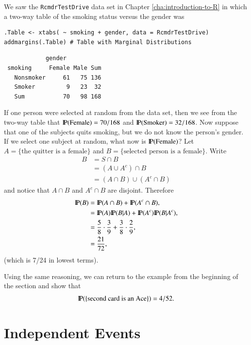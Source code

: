 \documentclass[captions=tableheading]{scrbook}
\begin{document}
\begin{example}
We saw the \texttt{RcmdrTestDrive} data set in Chapter \ref{cha:introduction-to-R} in which a two-way table of the smoking status versus the gender was 


\begin{verbatim}
.Table <- xtabs( ~ smoking + gender, data = RcmdrTestDrive)
addmargins(.Table) # Table with Marginal Distributions
\end{verbatim}

\begin{verbatim}
            gender
 smoking     Female Male Sum
   Nonsmoker     61   75 136
   Smoker         9   23  32
   Sum           70   98 168
\end{verbatim}

If one person were selected at random from the data set, then we see from the two-way table that \(\P(\mbox{Female})=70/168\) and \(\P(\mbox{Smoker})=32/168\). Now suppose that one of the subjects quits smoking, but we do not know the person's gender. If we select one subject at random, what now is \(\P(\mbox{Female})\)? Let \( A = \{ \mbox{the quitter is a female} \} \) and \( B = \{ \mbox{selected person is a female} \} \). Write
\begin{align*}
B & =S\cap B\\
 & =(A\cup A^{c})\cap B\\
 & =(A\cap B)\cup(A^{c}\cap B)
\end{align*}
and notice that \(A\cap B\) and \(A^{c}\cap B\) are disjoint. Therefore
\begin{align*}
\P(B) & =\P(A\cap B)+\P(A^{c}\cap B),\\
 & =\P(A)\P(B|A)+\P(A^{c})\P(B|A^{c}),\\
 & =\frac{5}{8}\cdot\frac{3}{9}+\frac{3}{8}\cdot\frac{2}{9},\\
 & =\frac{21}{72},
\end{align*}
(which is 7/24 in lowest terms).

\end{example}
Using the same reasoning, we can return to the example from the beginning of the section and show that
\[
\P(\{ \mbox{second card is an Ace} \} )=4/52.
\]
 
\section{Independent Events}
\label{sec-3-7}

\label{sec:Independent-Events}
\end{document}
